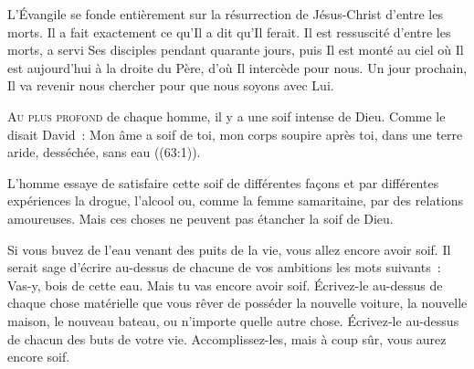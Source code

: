 
L'Évangile  se fonde entièrement sur la résurrection
 de Jésus-Christ d'entre les morts. Il a fait exactement ce qu'Il a dit
 qu'Il ferait. Il est ressuscité d'entre les morts, a servi Ses disciples
 pendant quarante jours, puis Il est monté au ciel où Il est aujourd'hui
 à la droite du Père, d'où Il intercède pour nous. Un jour prochain,
 Il va revenir nous chercher pour que nous soyons avec Lui.

\dvrule






\lettrine{A}{u plus profond} de chaque homme, il y a une soif intense de Dieu.
 Comme le disait David~: 
 \og Mon âme a soif de toi, mon corps soupire après toi,
 dans une terre aride, desséchée, sans eau \fg{}
 ((63:1)). 

L'homme essaye de satisfaire cette soif de différentes façons
 et par différentes expériences \ocadr la drogue, l'alcool ou,
 comme la femme samaritaine, par des relations amoureuses.
 Mais ces choses ne peuvent pas étancher la soif de Dieu.


Si vous buvez de l'eau venant des puits de la vie,
 vous allez encore avoir soif. Il serait sage d'écrire au-dessus
 de chacune de vos ambitions les mots suivants~:
 \og Vas-y, bois de cette eau. Mais tu vas encore avoir soif. \fg{}
 Écrivez-le  au-dessus de chaque chose matérielle
 que vous rêver de posséder \ocadr la nouvelle voiture, la nouvelle maison,
 le nouveau bateau, ou n'importe quelle autre chose.
 Écrivez-le au-dessus de chacun des buts de votre vie.
 Accomplissez-les, mais à coup sûr, vous aurez encore soif.

